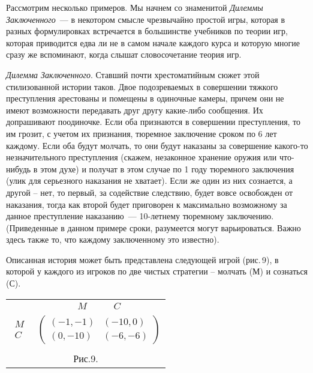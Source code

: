 Рассмотрим несколько примеров. Мы начнем со знаменитой {\it Дилеммы
Заключенного}~--- в некотором смысле чрезвычайно простой игры,
которая в разных формулировках встречается в большинстве учебников
по теории игр, которая приводится едва ли не в самом начале каждого
курса и которую многие сразу же вспоминают, когда слышат
словосочетание теория игр.

{\it Дилемма Заключенного}. Ставший почти хрестоматийным сюжет
этой стилизованной истории таков. Двое подозреваемых в совершении
тяжкого преступления арестованы и помещены в одиночные камеры,
причем они не имеют возможности передавать друг другу какие-либо
сообщения. Их допрашивают поодиночке. Если оба признаются в
совершении преступления, то им грозит, с учетом их признания,
тюремное заключение сроком по 6 лет каждому. Если оба будут
молчать, то они будут наказаны за совершение какого-то
незначительного преступления (скажем, незаконное хранение оружия
или что-нибудь в этом духе) и получат в этом случае по 1 году
тюремного заключения (улик для серьезного наказания не хватает).
Если же один из них сознается, а другой -- нет, то первый, за
содействие следствию, будет вовсе освобожден от наказания, тогда
как второй будет приговорен к максимально возможному за данное
преступление наказанию~--- 10-летнему тюремному заключению.
(Приведенные в данном примере сроки, разумеется могут
варьироваться. Важно здесь также то, что каждому заключенному это
известно).

Описанная история может быть представлена следующей игрой
(рис.\,9), в которой у каждого из игроков по две чистых стратегии
-- молчать (М) и сознаться (С).

\begin{center}
\begin{tabular}{cc}
&$\begin{array}{cc} M\quad &\quad C \end{array}$\\
$\begin{array}{c} M\\  C\end{array}$& $\left(\begin{array}{cc}
(-1,-1)&(-10,0)\\
(0,-10)&(-6,-6) \end{array}\right)$\\
\multicolumn{2}{c}{}\\
\multicolumn{2}{c}{Рис.9.}\\
\end{tabular}
\end{center}

